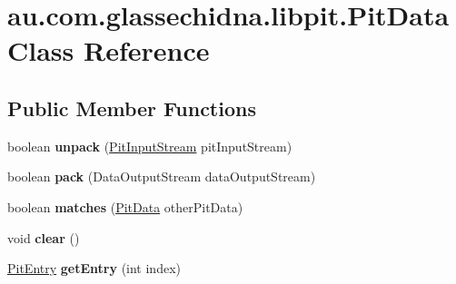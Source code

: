 \hypertarget{classau_1_1com_1_1glassechidna_1_1libpit_1_1PitData}{\section{au.\-com.\-glassechidna.\-libpit.\-Pit\-Data Class Reference}
\label{classau_1_1com_1_1glassechidna_1_1libpit_1_1PitData}
}
\subsection*{Public Member Functions}
\begin{DoxyCompactItemize}
\item 
\hypertarget{classau_1_1com_1_1glassechidna_1_1libpit_1_1PitData_a984e8d9855612b6012bf66eed87d0325}{boolean {\bfseries unpack} (\hyperlink{classau_1_1com_1_1glassechidna_1_1libpit_1_1PitInputStream}{Pit\-Input\-Stream} pit\-Input\-Stream)}\label{classau_1_1com_1_1glassechidna_1_1libpit_1_1PitData_a984e8d9855612b6012bf66eed87d0325}

\item 
\hypertarget{classau_1_1com_1_1glassechidna_1_1libpit_1_1PitData_afd7ea3f2f6060a7508703ffbcba12638}{boolean {\bfseries pack} (Data\-Output\-Stream data\-Output\-Stream)}\label{classau_1_1com_1_1glassechidna_1_1libpit_1_1PitData_afd7ea3f2f6060a7508703ffbcba12638}

\item 
\hypertarget{classau_1_1com_1_1glassechidna_1_1libpit_1_1PitData_a77036979cf340f1c565a9b72bbbe525a}{boolean {\bfseries matches} (\hyperlink{classau_1_1com_1_1glassechidna_1_1libpit_1_1PitData}{Pit\-Data} other\-Pit\-Data)}\label{classau_1_1com_1_1glassechidna_1_1libpit_1_1PitData_a77036979cf340f1c565a9b72bbbe525a}

\item 
\hypertarget{classau_1_1com_1_1glassechidna_1_1libpit_1_1PitData_a81380d08484bb2291ccb3252bdcac0dc}{void {\bfseries clear} ()}\label{classau_1_1com_1_1glassechidna_1_1libpit_1_1PitData_a81380d08484bb2291ccb3252bdcac0dc}

\item 
\hypertarget{classau_1_1com_1_1glassechidna_1_1libpit_1_1PitData_a2ec700a094729a32c3046b1195d91873}{\hyperlink{classau_1_1com_1_1glassechidna_1_1libpit_1_1PitEntry}{Pit\-Entry} {\bfseries get\-Entry} (int index)}\label{classau_1_1com_1_1glassechidna_1_1libpit_1_1PitData_a2ec700a094729a32c3046b1195d91873}


\end{DoxyCompactItemize}
